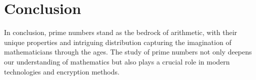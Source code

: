 \documentclass{article}
\begin{document}
\section*{Conclusion}
In conclusion, prime numbers stand as the bedrock of arithmetic, with their unique properties and intriguing distribution capturing the imagination of mathematicians through the ages. The study of prime numbers not only deepens our understanding of mathematics but also plays a crucial role in modern technologies and encryption methods.
\end{document}
